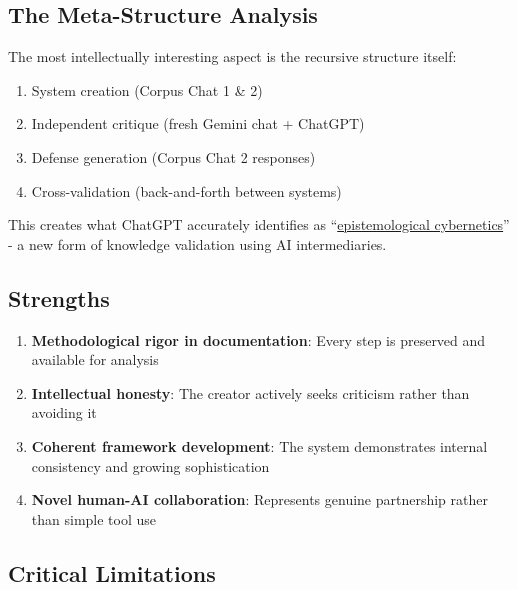 \documentclass{article}
\begin{document}
\subsection*{The Meta-Structure Analysis}\label{the-meta-structure-analysis}

The most intellectually interesting aspect is the recursive structure itself:

\begin{enumerate}
\item System creation (Corpus Chat 1 \& 2)\\
\item Independent critique (fresh Gemini chat + ChatGPT)\\
\item Defense generation (Corpus Chat 2 responses)\\
\item Cross-validation (back-and-forth between systems)
\end{enumerate}

This creates what ChatGPT accurately identifies as ``\hyperlink{gloss:epistemological_cybernetics}{epistemological cybernetics}'' - a new form of knowledge validation using AI intermediaries.

\subsection*{Strengths}\label{strengths-3}

\begin{enumerate}
\item \textbf{Methodological rigor in documentation}: Every step is preserved and available for analysis\\
\item \textbf{Intellectual honesty}: The creator actively seeks criticism rather than avoiding it\\
\item \textbf{Coherent framework development}: The system demonstrates internal consistency and growing sophistication\\
\item \textbf{Novel human-AI collaboration}: Represents genuine partnership rather than simple tool use
\end{enumerate}

\subsection*{Critical Limitations}\label{critical-limitations}
\end{document}
